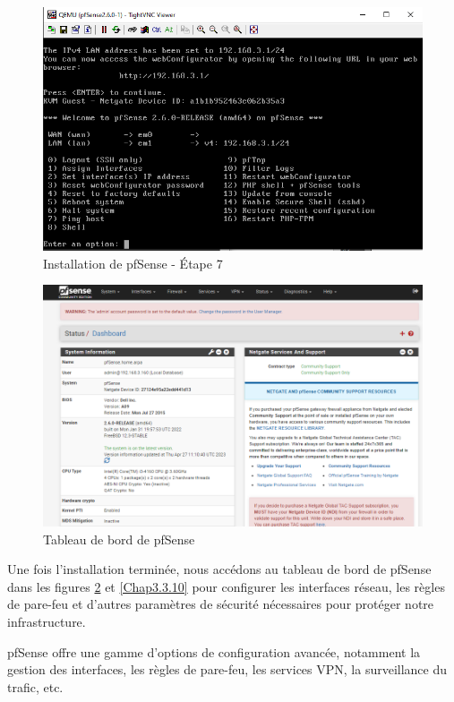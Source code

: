 \begin{figure}[H]
\centering
\includegraphics[width=15cm]{Images/BRadesMelian-Topologie8.png}
\caption{Installation de pfSense - Étape 7}
\label{Chap3.3.8}
\end{figure}

\begin{figure}[H]
\centering
\includegraphics[width=15cm]{Images/BRadesMelian-Topologie14.png}
\caption{Tableau de bord de pfSense}
\label{Chap3.3.9}
\end{figure}

Une fois l'installation terminée, nous accédons au tableau de bord de pfSense dans les figures \ref{Chap3.3.9} et \ref{Chap3.3.10} pour configurer les interfaces réseau, les règles de pare-feu et d'autres paramètres de sécurité nécessaires pour protéger notre infrastructure.

pfSense offre une gamme d'options de configuration avancée, notamment la gestion des interfaces, les règles de pare-feu, les services VPN, la surveillance du trafic, etc. 

